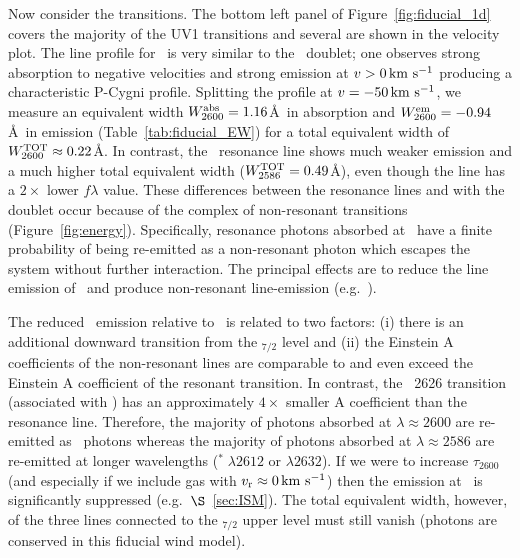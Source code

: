 \documentclass[12pt,preprint]{aastex}
\begin{document}
Now consider the  transitions.
The bottom left panel of Figure~\ref{fig:fiducial_1d} covers the
majority of the  UV1 transitions and several are
shown in the velocity plot.  The line
profile for \feiib\ is very similar to the \mgiid\ doublet;
one observes strong absorption to negative velocities and strong
emission at $v > 0 \, {\rm km~s^{-1}}$ producing a characteristic P-Cygni profile. 
Splitting
the profile at $v = -50 \, {\rm km~s^{-1}}$, we measure an equivalent width
$W_{2600}^{\rm abs} = 1.16$\AA\ in absorption and $W_{2600}^{\rm em} =
-0.94$\AA\ in emission (Table~\ref{tab:fiducial_EW}) for a total
equivalent width of $W_{2600}^{\rm TOT} \approx 0.22$\AA.  
In contrast, the \feiia\ resonance line shows much weaker emission and
a much higher total equivalent width ($W_{2586}^{\rm TOT} = 0.49$\AA),
even though the line has a $2 \times$ lower $f\lambda$ value.
These differences between the  resonance lines and with the
 doublet occur because of the complex of non-resonant
 transitions (Figure~\ref{fig:energy}).  Specifically,
resonance photons absorbed at \feiid\ have a finite probability of
being re-emitted as a non-resonant photon which escapes the system
without further interaction.  The principal effects are to reduce the
line emission of \feiid\ and produce non-resonant line-emission (e.g.\
\feiic).

The reduced \feiia\ emission relative to \feiib\ is related to
two factors:
(i) there is an additional downward transition from the
\zconfig$_{7/2}$ level and 
(ii) the Einstein A
coefficients of the non-resonant lines are comparable to and even
exceed the Einstein A coefficient of
the resonant transition.  In contrast, 
the ~2626 transition (associated with \feiib)
has an approximately  $4\times$ smaller A coefficient than the
resonance line.  Therefore, the majority of photons absorbed at
$\lambda \approx 2600$ are re-emitted as \feiib\ photons whereas 
the majority of photons absorbed at $\lambda \approx 2586$ are re-emitted 
at longer wavelengths (\ion{Fe}{2}$^* \; \lambda 2612$ or $\lambda
2632$).
If we were to increase $\tau_{2600}$ (and especially if we include
gas with $v_{\rm r} \approx 0 \, {\rm km~s^{-1}}$) then the emission at \feiib\ is
significantly suppressed (e.g.\ $\S$~\ref{sec:ISM}).
The total equivalent width, however, of the three lines connected to the
\zconfig$_{7/2}$ upper level must still vanish (photons are conserved
in this fiducial wind model).
\end{document}
